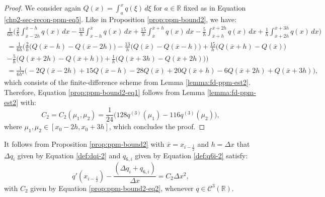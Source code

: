 \begin{proof}
	We consider again $Q(x) = \int_{a}^{x} q(\xi) \,d\xi$ for $a \in \mathbb{R}$ fixed as in 
	Equation \eqref{chp2-sec-recon-ppm-eq5}. 
	Like in Proposition \ref{prop:ppm-bound2}, we have:
	\begin{align*}
	\frac{1}{6h}
	\bigg( \frac{2}{h} \int_{\overline{x}-2h}^{\overline{x}-h} q(x) \,dx 
		      -\frac{13}{h}\int_{\overline{x}-h}^{\overline{x}} q(x) \,dx   
		      +\frac{15}{h}\int_{\overline{x}}^{\overline{x}+h} q(x) \,dx 
		      -\frac{5}{h} \int_{\overline{x}+h}^{\overline{x}+2h} q(x) \,dx   
		      +\frac{1}{h} \int_{\overline{x}+2h}^{\overline{x}+3h} q(x) \,dx   
		\bigg)\\
		= \frac{1}{6h} \bigg(
		\frac{2}{h}   \big( Q(\overline{x}-h)- Q(\overline{x}-2h)\big) 
		-\frac{13}{h} \big( Q(\overline{x}) - Q(\overline{x}-h) \big) 
		+\frac{15}{h} \big( Q(\overline{x}+h) - Q(\overline{x})  \big) \\
		-\frac{5}{h}  \big( Q(\overline{x}+2h) - Q(\overline{x}+h)  \big) 
		+\frac{1}{h}  \big( Q(\overline{x}+3h) - Q(\overline{x}+2h)  \big) 
		\bigg)\\
		= \frac{1}{6h^2}\bigg(-2Q(\overline{x}-2h) + 15Q(\overline{x}-h) - 28Q(\overline{x}) 
		+20Q(\overline{x}+h) -6Q(\overline{x}+2h) + Q(\overline{x}+3h)  \bigg),
	\end{align*}
	which consists of the finite-difference scheme from Lemma \ref{lemma:fd-ppm-est2}. 
	Therefore, Equation \eqref{prop:ppm-bound2-eq1} follows from Lemma \ref{lemma:fd-ppm-est2} with:
	\begin{equation}
		\label{prop:ppm-bound2-eq2}
		C_2 = C_2(\mu_1,\mu_2) = \frac{1}{24}\bigg(128q^{(3)}(\mu_{1}) - 116q^{(3)}(\mu_{2})\bigg), 
	\end{equation}
	where $\mu_{1}, \mu_{2} \in [x_0-2h,x_0+3h]$, which concludes the proof.
\end{proof}
\begin{corollary}
	\label{prop:ppm-bound2-corollary}
	It follows from Proposition \ref{prop:ppm-bound2} with $\overline{x} = x_{i-\frac{1}{2}}$
	and $h = \Delta x$ that $\Delta q_i$ given by Equation \eqref{def:dqi-2} 
	and $q_{6,i}$ given by Equation \eqref{def:q6i-2} satisfy:
	\begin{equation}
	q'(x_{i-\frac{1}{2}})-\frac{(\Delta q_i + q_{6, i})}{\Delta x}  = C_2\Delta x^2,
	\end{equation}
	with $C_2$ given by Equation \eqref{prop:ppm-bound2-eq2}, whenever $q \in \mathcal{C}^3(\mathbb{R})$.
\end{corollary}
